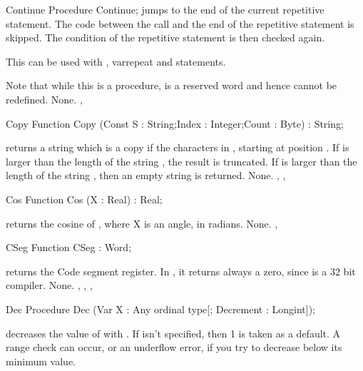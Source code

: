 \documentclass{report}
\begin{document}

\begin{procedure}{Continue}
\Declaration
Procedure Continue;
\Description
{} jumps to the end of the current repetitive statement. 
The code between the  call and the end of the repetitive 
statement is skipped. The condition of the repetitive statement is then
checked again.

This can be used with , var{repeat} and  statements.

Note that while this is a procedure,  is a reserved word
and hence cannot be redefined.
\Errors
None.
\SeeAlso
{}, 
\end{procedure}



\begin{function}{Copy}
\Declaration
Function Copy (Const S : String;Index : Integer;Count : Byte) : String;

\Description
{} returns a string which is a copy if the  characters
in , starting at position . If  is larger than
the length of the string , the result is truncated.
If  is larger than the length of the string , then an
empty string is returned.
\Errors
None.
\SeeAlso
{}, , 
\end{function}


\begin{function}{Cos}
\Declaration
Function Cos (X : Real) : Real;

\Description
{} returns the cosine of , where X is an angle, in radians.
\Errors
None.
\SeeAlso
{}, 
\end{function}


\begin{function}{CSeg}
\Declaration
Function CSeg  : Word;

\Description
{} returns the Code segment register. In \fpc, it returns always a
zero, since \fpc is a 32 bit compiler.
\Errors
None.
\SeeAlso
{}, , , 
\end{function}


\begin{procedure}{Dec}
\Declaration
Procedure Dec (Var X : Any ordinal type[; Decrement : Longint]);

\Description
{} decreases the value of  with .
If  isn't specified, then 1 is taken as a default.
\Errors
A range check can occur, or an underflow error, if you try to decrease 
below its minimum value.
\SeeAlso
{}
\end{procedure}
\end{document}
